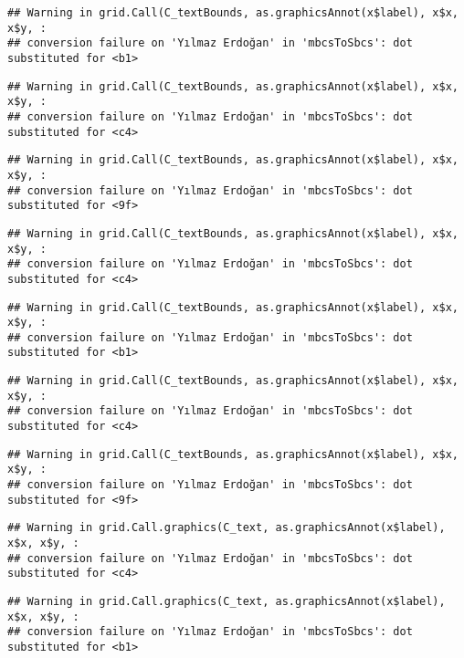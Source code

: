 \documentclass[
]{article}
\begin{document}
\begin{verbatim}
## Warning in grid.Call(C_textBounds, as.graphicsAnnot(x$label), x$x, x$y, :
## conversion failure on 'Yılmaz Erdoğan' in 'mbcsToSbcs': dot substituted for <b1>
\end{verbatim}

\begin{verbatim}
## Warning in grid.Call(C_textBounds, as.graphicsAnnot(x$label), x$x, x$y, :
## conversion failure on 'Yılmaz Erdoğan' in 'mbcsToSbcs': dot substituted for <c4>
\end{verbatim}

\begin{verbatim}
## Warning in grid.Call(C_textBounds, as.graphicsAnnot(x$label), x$x, x$y, :
## conversion failure on 'Yılmaz Erdoğan' in 'mbcsToSbcs': dot substituted for <9f>
\end{verbatim}

\begin{verbatim}
## Warning in grid.Call(C_textBounds, as.graphicsAnnot(x$label), x$x, x$y, :
## conversion failure on 'Yılmaz Erdoğan' in 'mbcsToSbcs': dot substituted for <c4>
\end{verbatim}

\begin{verbatim}
## Warning in grid.Call(C_textBounds, as.graphicsAnnot(x$label), x$x, x$y, :
## conversion failure on 'Yılmaz Erdoğan' in 'mbcsToSbcs': dot substituted for <b1>
\end{verbatim}

\begin{verbatim}
## Warning in grid.Call(C_textBounds, as.graphicsAnnot(x$label), x$x, x$y, :
## conversion failure on 'Yılmaz Erdoğan' in 'mbcsToSbcs': dot substituted for <c4>
\end{verbatim}

\begin{verbatim}
## Warning in grid.Call(C_textBounds, as.graphicsAnnot(x$label), x$x, x$y, :
## conversion failure on 'Yılmaz Erdoğan' in 'mbcsToSbcs': dot substituted for <9f>
\end{verbatim}

\begin{verbatim}
## Warning in grid.Call.graphics(C_text, as.graphicsAnnot(x$label), x$x, x$y, :
## conversion failure on 'Yılmaz Erdoğan' in 'mbcsToSbcs': dot substituted for <c4>
\end{verbatim}

\begin{verbatim}
## Warning in grid.Call.graphics(C_text, as.graphicsAnnot(x$label), x$x, x$y, :
## conversion failure on 'Yılmaz Erdoğan' in 'mbcsToSbcs': dot substituted for <b1>
\end{verbatim}
\end{document}
